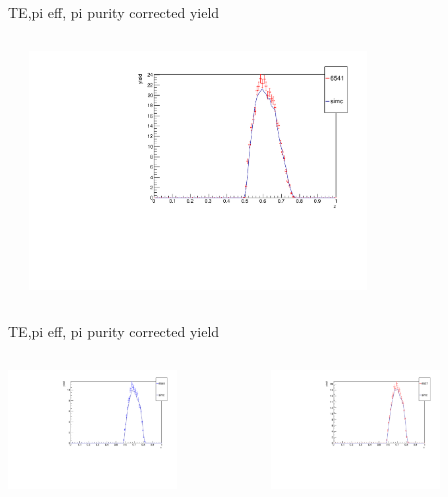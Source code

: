 \begin{frame}{TE,pi eff, pi purity corrected yield}
\begin{columns}
\begin{column}[T]{0.5\textwidth}
\end{column}
\begin{column}[T]{0.5\textwidth}
\includegraphics[width = 0.7\textwidth]{results/yield/check/yieldcheck_390_pos.pdf}
\end{column}
\end{columns}
\end{frame}
\begin{frame}{TE,pi eff, pi purity corrected yield}
\begin{columns}
\begin{column}[T]{0.5\textwidth}
\includegraphics[width = 0.7\textwidth]{results/yield/check/yieldcheck_380_neg.pdf}
\end{column}
\begin{column}[T]{0.5\textwidth}
\includegraphics[width = 0.7\textwidth]{results/yield/check/yieldcheck_380_pos.pdf}
\end{column}
\end{columns}
\end{frame}
